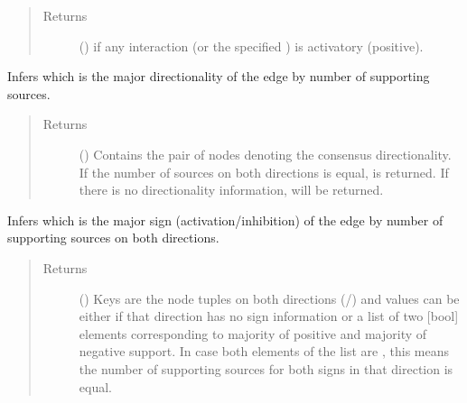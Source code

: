 \documentclass[letterpaper,10pt,english]{sphinxmanual}
\begin{document}
\begin{fulllineitems}
\begin{fulllineitems}
\begin{quote}
\begin{description}
\item[{Returns}] \leavevmode
() \textendash{}  if any interaction (or the specified
) is activatory (positive).

\end{description}\end{quote}

\end{fulllineitems}


\begin{fulllineitems}
\label{\detokenize{main:pypath.main.Direction.majority_dir}}
Infers which is the major directionality of the edge by number
of supporting sources.
\begin{quote}\begin{description}
\item[{Returns}] \leavevmode
() \textendash{} Contains the pair of nodes denoting the
consensus directionality. If the number of sources on both
directions is equal,  is returned. If there is no
directionality information,  will be
returned.

\end{description}\end{quote}

\end{fulllineitems}


\begin{fulllineitems}
\label{\detokenize{main:pypath.main.Direction.majority_sign}}
Infers which is the major sign (activation/inhibition) of the
edge by number of supporting sources on both directions.
\begin{quote}\begin{description}
\item[{Returns}] \leavevmode
() \textendash{} Keys are the node tuples on both directions
(/) and values can be
either  if that direction has no sign information or
a list of two {[}bool{]} elements corresponding to majority of
positive and majority of negative support. In case both
elements of the list are , this means the number of
supporting sources for both signs in that direction is
equal.


\end{description}
\end{quote}
\end{fulllineitems}
\end{fulllineitems}
\end{document}
